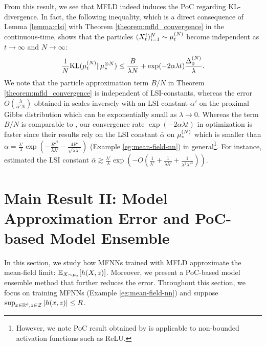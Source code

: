 From this result, we see that MFLD indeed induces the PoC regarding KL-divergence. In fact, the following inequality, which is a direct consequence of Lemma \ref{lemma:clsi} with Theorem \ref{theorem:mfld_convergence} in the continuous-time,
shows that the particles $(X^i_t)_{i=1}^N \sim \pow[\mu,N]_t$ become independent as $t \to \infty$ and $N \to \infty$:
\begin{equation}\label{eq:mfld_poc}
    \frac{1}{N}\KL(\pow[\mu,N]_t \| \tensor[\mu,N]_*) 
    \leq \frac{B}{\lambda N} + \exp(-2\alpha \lambda t) \frac{\pow[\Delta,N]_0}{\lambda}.
\end{equation}
We note that the particle approximation term $B/N$ in Theorem \ref{theorem:mfld_convergence} is independent of LSI-constants, whereas the error $O(\frac{\lambda}{\alpha' N})$ obtained in \citet{suzuki2023convergence} scales inversely with an LSI constant $\alpha'$ on the proximal Gibbs distribution which can be exponentially small as $\lambda \to 0$. Whereas the term $B/N$ is comparable to \citet{nitanda2024improved,chewi2024uniform}, our convergence rate $\exp(-2\alpha \lambda t)$ in optimization is faster since their results rely on the LSI constant $\bar{\alpha}$ on $\pow[\mu,N]_*$ which is smaller than $\alpha = \frac{\lambda'}{\lambda}\exp\left( -\frac{R'^{2}}{\lambda\lambda'} - \frac{4R'}{\sqrt{\lambda\lambda'}} \right)$ (Example \ref{eg:mean-field-nn}) in general\footnote{However, we note PoC result obtained by \citet{chewi2024uniform} is applicable to non-bounded activation functions such as ReLU.}. For instance, \citet{chewi2024uniform} estimated the LSI constant $\bar{\alpha} \gtrsim\frac{\lambda'}{\lambda}\exp\left(-O\left( \frac{1}{\lambda'} + \frac{1}{\lambda \lambda'} + \frac{1}{\lambda^2 \lambda'^{3}}\right)\right)$.

\section{Main Result II: Model Approximation Error and PoC-based Model Ensemble}\label{sec:main_results2}
In this section, we study how MFNNs trained with MFLD approximate the mean-field limit: $\mathbb{E}_{X\sim \mu_*}[h(X,z)]$. Moreover, we present a PoC-based model ensemble method that further reduces the error.
Throughout this section, we focus on training MFNNs (Example \ref{eg:mean-field-nn}) and suppose $\sup_{x\in \mathbb{R}^d, z\in \mathcal{Z}}|h(x,z)| \leq R$.
